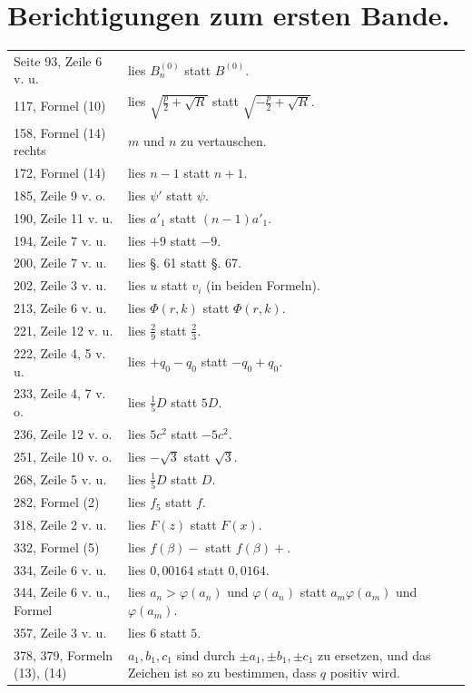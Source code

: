 \documentclass[11pt]{article}
\begin{document}
\section*{Berichtigungen zum ersten Bande.}
\begin{longtable}{p{}p{}}
Seite 93, Zeile 6 v. u. & lies $B_n^{(0)}$ statt $B^{(0)}$.\\
117, Formel (10) & lies $\sqrt{\frac{p}{2}+\sqrt{R}}$ statt $\sqrt{-\frac{p}{2}+\sqrt{R}}$.\\
158, Formel (14) rechts & $m$ und $n$ zu vertauschen.\\
172, Formel (14) & lies $n-1$ statt $n+1$.\\
185, Zeile 9 v. o. & lies $\psi'$ statt $\psi$.\\
190, Zeile 11 v. u. & lies $a'_1$ statt $(n-1)a'_1$.\\
194, Zeile 7 v. u. & lies $+9$ statt $-9$.\\
200, Zeile 7 v. u. & lies §. 61 statt §. 67.\\
202, Zeile 3 v. u. & lies $u$ statt $v_i$ (in beiden Formeln).\\
213, Zeile 6 v. u. & lies $\Phi(r,k)$ statt $\Phi(r,k)$.\\
221, Zeile 12 v. u. & lies $\frac{2}{9}$ statt $\frac{2}{3}$.\\
222, Zeile 4, 5 v. u. & lies $+q_0-q_0$ statt $-q_0+q_0$.\\
233, Zeile 4, 7 v. o. & lies $\frac{1}{5}D$ statt $5D$.\\
236, Zeile 12 v. o. & lies $5c^2$ statt $-5c^2$.\\
251, Zeile 10 v. o. & lies $-\sqrt{3}$ statt $\sqrt{3}$.\\
268, Zeile 5 v. u. & lies $\frac{1}{5}D$ statt $D$.\\
282, Formel (2) & lies $f_5$ statt $f$.\\
318, Zeile 2 v. u. & lies $F(z)$ statt $F(x)$.\\
332, Formel (5) & lies $f(\beta)-$ statt $f(\beta)+$.\\
334, Zeile 6 v. u. & lies $0{,}00164$ statt $0{,}0164$.\\
344, Zeile 6 v. u., Formel & lies $a_n>\varphi(a_n)$ und $\varphi(a_n)$ statt $a_m\varphi(a_m)$ und $\varphi(a_m)$.\\
357, Zeile 3 v. u. & lies $6$ statt $5$.\\
378, 379, Formeln (13), (14) & $a_1,b_1,c_1$ sind durch $\pm a_1,\pm b_1,\pm c_1$ zu ersetzen, und das Zeichen ist so zu bestimmen, dass $q$ positiv wird.\\

\end{longtable}
\end{document}
